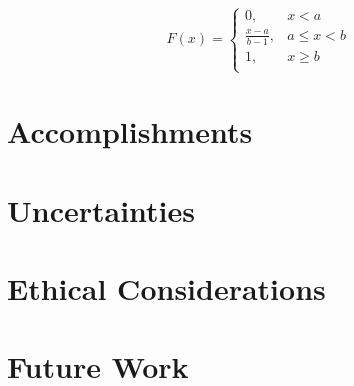 \documentclass{senior-design}
\begin{document}
\begin{equation}
    F\left( x \right) =\begin{cases}
        0,&		x<a\\
        \frac{x-a}{b-1},&		a\leqslant x<b\\
        1,&		x\geqslant b\\
    \end{cases}
\end{equation}

\section{Accomplishments}
\section{Uncertainties}
\section{Ethical Considerations}
\section{Future Work}
\end{document}
